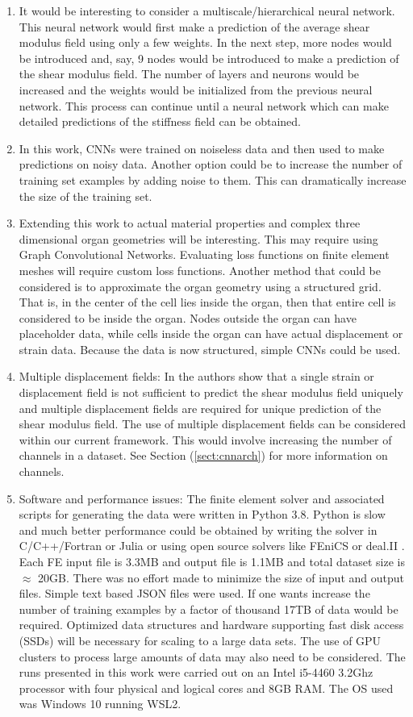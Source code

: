 \documentclass[12pt]{article}
\begin{document}
\begin{enumerate}
\item{It would be interesting to consider a multiscale/hierarchical neural network. This neural network would first make a prediction of the average shear modulus field using only a few weights. In the next step, more nodes would be introduced and, say, 9 nodes would be introduced to make a prediction of the shear modulus field. The number of layers and neurons would be increased and the weights would be initialized from the previous neural network. This process can continue until a neural network which can make detailed predictions of the stiffness field can be obtained.}
\item{In this work, CNNs were trained on noiseless data and then used to make predictions on noisy data. Another option could be to increase the number of training set examples by adding noise to them. This can dramatically increase the size of the training set.}
\item{Extending this work to actual material properties and complex three dimensional organ geometries will be interesting. This may require using Graph Convolutional Networks. Evaluating loss functions on finite element meshes will require custom loss functions. Another method that could be considered is to approximate the organ geometry using a structured grid. That is, in the center of the cell lies inside the organ, then that entire cell is considered to be inside the organ. Nodes outside the organ can have placeholder data, while cells inside the organ can have actual displacement or strain data. Because the data is now structured, simple CNNs could be used.}
\item{Multiple displacement fields: In \cite{paper:barbonegokhale,paper:barbonebamber} the authors show that a single strain or displacement field is not sufficient to predict the shear modulus field uniquely and multiple displacement fields are required for unique prediction of the shear modulus field. The use of multiple displacement fields can be considered within our current framework. This would involve increasing the number of channels in a dataset. See Section (\ref{sect:cnnarch}) for more information on channels.} 
\item{Software and performance issues: The finite element solver and associated scripts for generating the data were written in Python 3.8. Python is slow and much better performance could be obtained by writing the solver in C/C++/Fortran or Julia or using open source solvers like FEniCS \cite{paper:fenics} or deal.II \cite{misc:deal.ii}. Each FE input file is 3.3MB and output file is 1.1MB and total dataset size is $\approx$  20GB. There was no effort made to minimize the size of input and output files. Simple text based JSON files were used. If one wants increase the number of training examples by a factor of thousand 17TB of data would be required. Optimized data structures and hardware supporting fast disk access (SSDs) will be necessary for scaling to a large data sets. The use of GPU clusters to process large amounts of data may also need to be considered. The runs presented in this work were carried out on an Intel i5-4460 3.2Ghz processor with four physical and logical cores and 8GB RAM. The OS used was Windows 10 running WSL2.}

\end{enumerate}
\end{document}
